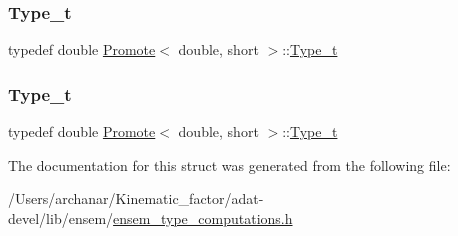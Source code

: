 \subsubsection{\texorpdfstring{Type\_t}{Type\_t}\hspace{0.1cm}{\footnotesize\ttfamily [2/3]}}
{\footnotesize\ttfamily typedef double \mbox{\hyperlink{structPromote}{Promote}}$<$ double, short $>$\+::\mbox{\hyperlink{structPromote_3_01double_00_01short_01_4_a14e4d674ead4648aefc2f0cee3552301}{Type\+\_\+t}}}

\mbox{\label{structPromote_3_01double_00_01short_01_4_a14e4d674ead4648aefc2f0cee3552301}} 
\subsubsection{\texorpdfstring{Type\_t}{Type\_t}\hspace{0.1cm}{\footnotesize\ttfamily [3/3]}}
{\footnotesize\ttfamily typedef double \mbox{\hyperlink{structPromote}{Promote}}$<$ double, short $>$\+::\mbox{\hyperlink{structPromote_3_01double_00_01short_01_4_a14e4d674ead4648aefc2f0cee3552301}{Type\+\_\+t}}}



The documentation for this struct was generated from the following file\+:\begin{DoxyCompactItemize}
\item 
/\+Users/archanar/\+Kinematic\+\_\+factor/adat-\/devel/lib/ensem/\mbox{\hyperlink{adat-devel_2lib_2ensem_2ensem__type__computations_8h}{ensem\+\_\+type\+\_\+computations.\+h}}\end{DoxyCompactItemize}
